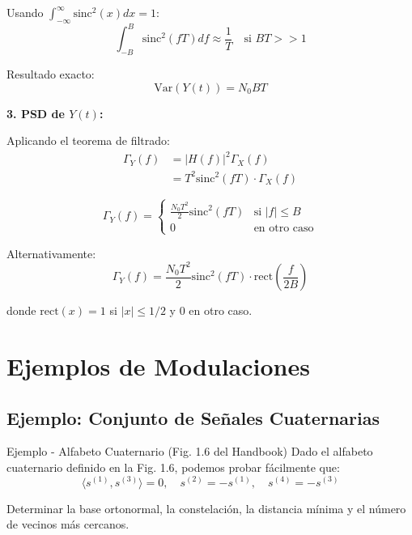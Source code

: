 \documentclass[10pt,a4paper]{article}
\begin{document}
\begin{solucion}
Usando $\int_{-\infty}^{\infty} \text{sinc}^2(x) dx = 1$:
\[
\int_{-B}^{B} \text{sinc}^2(fT) df \approx \frac{1}{T} \quad \text{si } BT >> 1
\]

Resultado exacto:
\[
\boxed{\text{Var}(Y(t)) = N_0 BT}
\]

\textbf{3. PSD de $Y(t)$:}

Aplicando el teorema de filtrado:
\begin{align*}
\Gamma_Y(f) &= |H(f)|^2 \Gamma_X(f)\\
&= T^2 \text{sinc}^2(fT) \cdot \Gamma_X(f)
\end{align*}

\[
\boxed{\Gamma_Y(f) = \begin{cases}
\frac{N_0 T^2}{2} \text{sinc}^2(fT) & \text{si } |f| \leq B\\
0 & \text{en otro caso}
\end{cases}}
\]

Alternativamente:
\[
\boxed{\Gamma_Y(f) = \frac{N_0 T^2}{2} \text{sinc}^2(fT) \cdot \text{rect}\left(\frac{f}{2B}\right)}
\]

donde $\text{rect}(x) = 1$ si $|x| \leq 1/2$ y $0$ en otro caso.
\end{solucion}

\section{Ejemplos de Modulaciones}

\subsection{Ejemplo: Conjunto de Señales Cuaternarias}

\begin{ejemplo}{Ejemplo - Alfabeto Cuaternario (Fig. 1.6 del Handbook)}
Dado el alfabeto cuaternario definido en la Fig. 1.6, podemos probar fácilmente que:
\[
\langle s^{(1)}, s^{(3)} \rangle = 0, \quad s^{(2)} = -s^{(1)}, \quad s^{(4)} = -s^{(3)}
\]

Determinar la base ortonormal, la constelación, la distancia mínima y el número de vecinos más cercanos.
\end{ejemplo}
\end{document}
